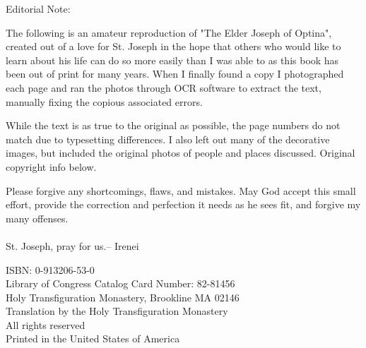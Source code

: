 \begin{adjustwidth}{.5cm}{.5cm}\itshape
	
	Editorial Note: 

    The following is an amateur reproduction of "The Elder Joseph of Optina", created out of a love for St. Joseph
    in the hope that others who would like to learn about his life can do so more easily than I was able to as this book has been 
    out of print for many years. When I finally found a copy I photographed each page and ran the photos
    through OCR software to extract the text, manually fixing the copious associated errors.

	While the text is as true to the original as possible, the page numbers do not match due to typesetting
	differences. I also left out many of the decorative images, 
	but included the original photos of people and places discussed. Original copyright info below.
	
	Please forgive any shortcomings, flaws, and mistakes. May God accept this small effort, 
	provide the correction and perfection it needs as he sees fit, and forgive my many offenses.\\
    \\
    St. Joseph, pray for us.\hspace*{\fill}-- Irenei\hspace*{1cm}
	
\end{adjustwidth}
\vspace*{\fill}
\begin{center}
	
	ISBN: 0-913206-53-0\\
	Library of Congress Catalog Card Number: 82-81456\\
	Holy Transfiguration Monastery, Brookline MA 02146\\
	Translation  by the Holy Transfiguration Monastery\\
	All rights reserved\\
	Printed in the United States of America
\end{center}
\clearpage
